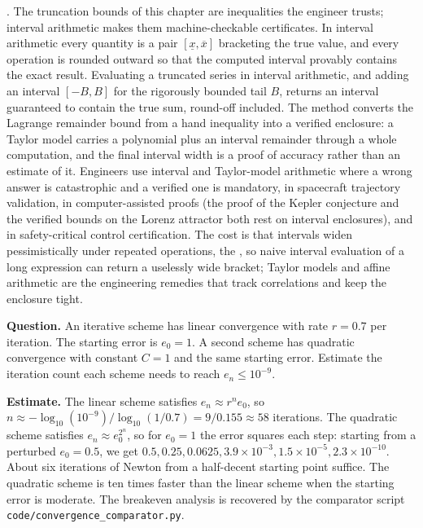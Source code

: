 \begin{mastery}
. The truncation bounds
of this chapter are inequalities the engineer trusts; interval
arithmetic makes them machine-checkable certificates. In interval
arithmetic every quantity is a pair $[\underline{x}, \overline{x}]$
bracketing the true value, and every operation is rounded outward so
that the computed interval provably contains the exact result.
Evaluating a truncated series in interval arithmetic, and adding an
interval $[-B, B]$ for the rigorously bounded tail $B$, returns an
interval guaranteed to contain the true sum, round-off included. The
method converts the Lagrange remainder bound from a hand inequality
into a verified enclosure: a Taylor model carries a polynomial plus an
interval remainder through a whole computation, and the final interval
width is a proof of accuracy rather than an estimate of it. Engineers
use interval and Taylor-model arithmetic where a wrong answer is
catastrophic and a verified one is mandatory, in spacecraft trajectory
validation, in computer-assisted proofs (the proof of the Kepler
conjecture and the verified bounds on the Lorenz attractor both rest on
interval enclosures), and in safety-critical control certification. The
cost is that intervals widen pessimistically under repeated operations,
the , so naive interval evaluation of a long
expression can return a uselessly wide bracket; Taylor models and affine
arithmetic are the engineering remedies that track correlations and keep
the enclosure tight.
\end{mastery}

\begin{estimation}
\textbf{Question.} An iterative scheme has linear convergence with
rate $r = 0.7$ per iteration. The starting error is $e_{0} = 1$.
A second scheme has quadratic convergence with constant $C = 1$ and
the same starting error. Estimate the iteration count each scheme
needs to reach $e_{n} \leq 10^{-9}$.

\textbf{Estimate.} The linear scheme satisfies $e_{n} \approx r^{n}
e_{0}$, so $n \approx -\log_{10}(10^{-9})/\log_{10}(1/0.7) = 9/0.155
\approx 58$ iterations. The quadratic scheme satisfies $e_{n}
\approx e_{0}^{2^{n}}$, so for $e_{0} = 1$ the error squares each
step: starting from a perturbed $e_{0} = 0.5$, we get $0.5, 0.25,
0.0625, 3.9 \times 10^{-3}, 1.5 \times 10^{-5}, 2.3 \times 10^{-10}$.
About six iterations of Newton from a half-decent starting point
suffice. The quadratic scheme is ten times faster than the linear
scheme when the starting error is moderate. The breakeven analysis
is recovered by the comparator script
\texttt{code/convergence\_comparator.py}.
\end{estimation}

